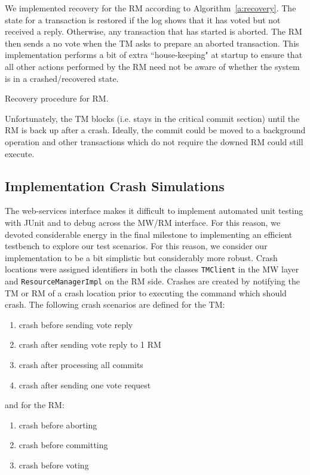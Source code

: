 \documentclass{article}
\begin{document}
We implemented recovery for the RM according to Algorithm~\ref{a:recovery}. The state for a transaction is restored if the log shows that it has voted but not received a reply. Otherwise, any transaction that has started is aborted. The RM then sends a no vote when the TM asks to prepare an aborted transaction. This implementation performs a bit of extra ``house-keeping" at startup to ensure that all other actions performed by the RM need not be aware of whether the system is in a crashed/recovered state.

\begin{algorithm}
\DontPrintSemicolon
	\caption{Recovery procedure for RM.}
	\label{a:recovery}
\end{algorithm}

Unfortunately, the TM blocks (i.e. stays in the critical commit section) until the RM is back up after a crash. Ideally, the commit could be moved to a background operation and other transactions which do not require the downed RM could still execute.
\subsection{Implementation Crash Simulations}

The web-services interface makes it difficult to implement automated unit testing with JUnit and to debug across the MW/RM interface. For this reason, we devoted considerable energy in the final milestone to implementing an efficient testbench to explore our test scenarios. For this reason, we consider our implementation to be a bit simplistic but considerably more robust. Crash locations were assigned identifiers in both the classes \texttt{TMClient} in the MW layer and \texttt{ResourceManagerImpl} on the RM side. Crashes are created by notifying the TM or RM of a crash location prior to executing the command which should crash. The following crash scenarios are defined for the TM:
\begin{enumerate}
  \item crash before sending vote reply
  \item crash after sending vote reply to 1 RM
  \item crash after processing all commits
  \item crash after sending one vote request
\end{enumerate}
and for the RM:
\begin{enumerate}
  \item crash before aborting
  \item crash before committing
  \item crash before voting
\end{enumerate}
\end{document}
